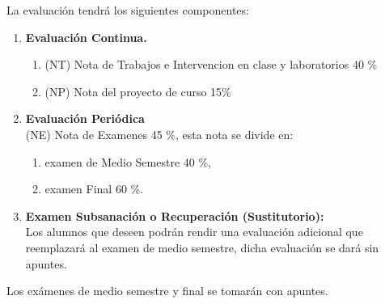 \documentclass{article}
\begin{document}
\begin{schedule}
\end{schedule}

\begin{evaluacion}
La evaluación tendrá los siguientes componentes:
\begin{enumerate}
\item \textbf{Evaluación Continua.}
  \begin{enumerate}
    \item(NT) Nota de Trabajos e Intervencion en clase y laboratorios 40 \%
    \item(NP) Nota del proyecto de curso 15\%
  \end{enumerate}
\item \textbf{Evaluación Periódica}\\
  (NE) Nota de Examenes 45 \%, esta nota se divide en:
  \begin{enumerate}
    \item examen de Medio Semestre 40 \%, 
    \item examen Final 60 \%.
  \end{enumerate}
\item \textbf{Examen Subsanación o Recuperación (Sustitutorio):}\\
  Los alumnos que deseen podrán rendir una evaluación adicional que reemplazará al examen de medio semestre, dicha evaluación se dará sin apuntes.
\end{enumerate}
Los exámenes de medio semestre y final se tomarán con apuntes.

\end{evaluacion}
\end{document}
